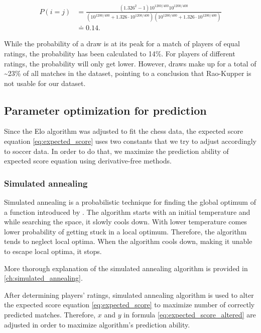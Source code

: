 \begin{align*}
P(i = j) &= \frac{\left(1.326^2 - 1\right)10^{1200/400}10^{1200/400}}{\left(10^{1200/400}+1.326\cdot 10^{1200/400}\right) \left( 10^{1200/400}+1.326\cdot 10^{1200/400}\right) } \\[1em]
&\doteq 0.14.
\end{align*}

While the probability of a draw is at its peak for a match of players of equal ratings, the probability has been calculated to 14\%. For players of different ratings, the probability will only get lower. However, draws make up for a total of \textasciitilde 23\% of all matches in the dataset, pointing to a conclusion that Rao-Kupper is not usable for our dataset.

\subsection{Parameter optimization for prediction}
Since the Elo algorithm was adjusted to fit the chess data, the expected score equation \eqref{eq:expected_score} uses two constants that we try to adjust accordingly to soccer data. In order to do that, we maximize the prediction ability of expected score equation using derivative-free methods.

\subsubsection{Simulated annealing}
\label{sec:simulated_annealing}
Simulated annealing is a probabilistic technique for finding the global optimum of a function introduced by \citet{KirkpatrickOptimizationSimulatedAnnealing1983}. The algorithm starts with an initial temperature and while searching the space, it slowly cools down. With lower temperature comes lower probability of getting stuck in a local optimum. Therefore, the algorithm tends to neglect local optima. When the algorithm cools down, making it unable to escape local optima, it stops.

More thorough explanation of the simulated annealing algorithm is provided in \autoref{ch:simulated_annealing}.

After determining players' ratings, simulated annealing algorithm is used to alter the expected score equation \eqref{eq:expected_score} to maximize number of correctly predicted matches. Therefore, $x$ and $y$ in formula \eqref{eq:expected_score_altered} are adjusted in order to maximize algorithm's prediction ability.

